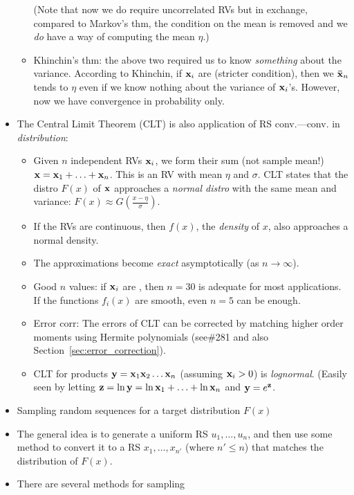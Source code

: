 \documentclass[a4paper]{book}
\begin{document}
\begin{itemize}
\begin{itemize}
	(Note that now we do require uncorrelated RVs but in exchange, compared to Markov's thm, the condition on the mean is removed and we \textit{do} have a way of computing the mean $\eta$.)
	\item Khinchin's thm: the above two required us to know \textit{something} about the variance. According to Khinchin, if $\mathbf{x}_i$ are \iid (stricter condition), then we $\mathbf{\bar{x}}_n$ tends to $\eta$ even if we know nothing about the variance of $\mathbf{x}_i$'s. However, now we have convergence in probability only.
	\end{itemize}
\item The Central Limit Theorem (CLT) is also application of RS conv.\----conv. in \textit{distribution}:
	\begin{itemize}
	\item Given $n$ independent RVs $\mathbf{x}_i$, we form their sum (not sample mean!) $\mathbf{x}=\mathbf{x}_1+ \hdots+ \mathbf{x}_n$. This is an RV with mean $\eta$ and $\sigma$. CLT states that the distro $F(x)$ of $\mathbf{x}$ approaches a \textit{normal distro} with the same mean and variance: $F(x)\approx G(\frac{x-\eta}{\sigma})$.
	\item If the RVs are continuous, then $f(x)$, the \textit{density} of $x$, also approaches a normal density.
	\item The approximations become \textit{exact} asymptotically (\ie as $n\to \infty$).  
	\item Good $n$ values: if $\mathbf{x}_i$ are \iid, then $n=30$ is adequate for most applications. If the functions $f_{i}(x)$ are smooth, even $n=5$ can be enough.
	\item Error corr: The errors of CLT can be corrected by matching higher order moments using Hermite polynomials (see\#281 and also Section~\ref{sec:error_correction}).
	\item CLT for products $\mathbf{y}=\mathbf{x}_1\mathbf{x}_2\hdots\mathbf{x}_n$ (assuming $\mathbf{x}_i>0$) is \textit{lognormal}. (Easily seen by letting $\mathbf{z} = \ln{\mathbf{y}} = \ln \mathbf{x}_1+\hdots+\ln\mathbf{x}_n$ and $\mathbf{y} = e^{\mathbf{z}}$.
	\end{itemize}
\item Sampling random sequences for a target distribution $F(x)$
\item The general idea is to generate a uniform RS $u_1, \hdots, u_n$, and then use some method to convert it to a RS $x_1, \hdots, x_{n'}$ (where $n' \leq n$) that matches the distribution of $F(x)$.
\item There are several methods for sampling
	\begin{itemize}

\end{itemize}
\end{itemize}
\end{document}
